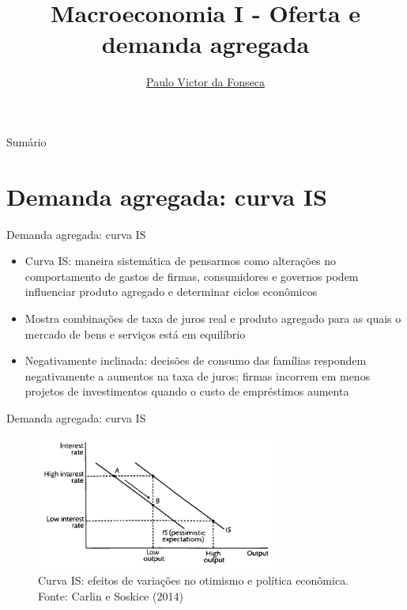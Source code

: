 \documentclass[10pt]{beamer}
\title[]{Macroeconomia I - Oferta e demanda agregada}
\author[]{\href{https://pvfonseca.github.io}{Paulo Victor da Fonseca}}
\date{}
\begin{document}
\begin{frame}[plain]
\end{frame}

\begin{frame}{Sumário}
    \tableofcontents
\end{frame}

\section{Demanda agregada: curva IS}
\begin{frame}
    {Demanda agregada: curva IS}
    \begin{itemize}
        \item Curva IS: maneira sistemática de pensarmos como alterações no comportamento de gastos de firmas, consumidores e governos podem influenciar produto agregado e determinar ciclos econômicos\bigskip
        \item Mostra combinações de taxa de juros real e produto agregado para as quais o mercado de bens e serviços está em equilíbrio\bigskip
        \item Negativamente inclinada: decisões de consumo das famílias respondem negativamente a aumentos na taxa de juros; firmas incorrem em menos projetos de investimentos quando o custo de empréstimos aumenta
    \end{itemize}
\end{frame}

\begin{frame}
    {Demanda agregada: curva IS}
    \begin{figure}
        \includegraphics[width=0.7\textwidth]{./figures/aula6_fig1.PNG}
        \caption{Curva IS: efeitos de variações no otimismo e política econômica. Fonte: Carlin e Soskice (2014)}
    \end{figure}
\end{frame}
\end{document}
